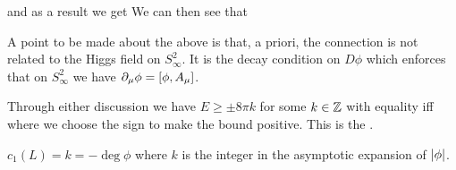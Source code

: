 \documentclass{article}
\begin{document}
\begin{enumerate}
and as a result we get 
We can then see that 
\end{enumerate} 
\begin{remark}
	A point to be made about the above is that, a priori, the connection is not related to the Higgs field on $S_\infty^2$. It is the decay condition on $D\phi$ which enforces that on $S_\infty^2$ we have $\del_\mu \phi = \comm[\phi]{A_\mu}$.
\end{remark}

Through either discussion we have $E\geq \pm 8\pi k$ for some $k \in \mbb{Z}$ with equality iff 
where we choose the sign to make the bound positive. This is the .
\begin{prop}
	$c_1(L)=k=-\deg\phi$ where $k$ is the integer in the asymptotic expansion of $\abs{\phi}$. 
\end{prop}
\end{document}
